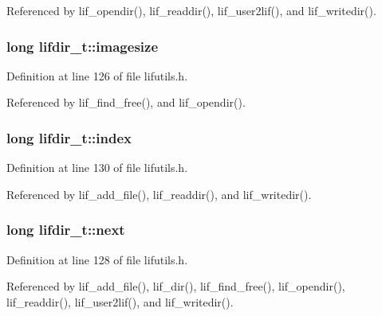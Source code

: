 Referenced by lif\+\_\+opendir(), lif\+\_\+readdir(), lif\+\_\+user2lif(), and lif\+\_\+writedir().

\subsubsection[{\texorpdfstring{imagesize}{imagesize}}]{\setlength{\rightskip}{0pt plus 5cm}long lifdir\+\_\+t\+::imagesize}\hypertarget{structlifdir__t_a2cae1515444f013eaf439333e3952b1d}{}\label{structlifdir__t_a2cae1515444f013eaf439333e3952b1d}


Definition at line 126 of file lifutils.\+h.



Referenced by lif\+\_\+find\+\_\+free(), and lif\+\_\+opendir().

\subsubsection[{\texorpdfstring{index}{index}}]{\setlength{\rightskip}{0pt plus 5cm}long lifdir\+\_\+t\+::index}\hypertarget{structlifdir__t_a7b9b45ee1a56ba386158da051605a8bd}{}\label{structlifdir__t_a7b9b45ee1a56ba386158da051605a8bd}


Definition at line 130 of file lifutils.\+h.



Referenced by lif\+\_\+add\+\_\+file(), lif\+\_\+readdir(), and lif\+\_\+writedir().

\subsubsection[{\texorpdfstring{next}{next}}]{\setlength{\rightskip}{0pt plus 5cm}long lifdir\+\_\+t\+::next}\hypertarget{structlifdir__t_a52a7520a6393d4782afb0ccd42899215}{}\label{structlifdir__t_a52a7520a6393d4782afb0ccd42899215}


Definition at line 128 of file lifutils.\+h.



Referenced by lif\+\_\+add\+\_\+file(), lif\+\_\+dir(), lif\+\_\+find\+\_\+free(), lif\+\_\+opendir(), lif\+\_\+readdir(), lif\+\_\+user2lif(), and lif\+\_\+writedir().

